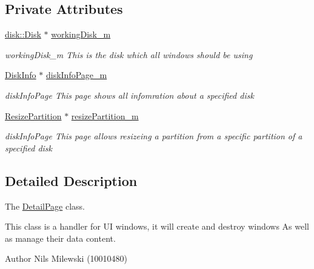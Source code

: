 \subsection*{Private Attributes}
\begin{DoxyCompactItemize}
\item 
\mbox{\label{class_detail_page_a6b523c0c4ee893b693a4e80e37d963c2}} 
\mbox{\hyperlink{classdisk_1_1_disk}{disk\+::\+Disk}} $\ast$ \mbox{\hyperlink{class_detail_page_a6b523c0c4ee893b693a4e80e37d963c2}{working\+Disk\+\_\+m}}
\begin{DoxyCompactList}\small\item\em working\+Disk\+\_\+m This is the disk which all windows should be using \end{DoxyCompactList}\item 
\mbox{\label{class_detail_page_ab455ab95d1ee1cf8009007f4f255f635}} 
\mbox{\hyperlink{class_disk_info}{Disk\+Info}} $\ast$ \mbox{\hyperlink{class_detail_page_ab455ab95d1ee1cf8009007f4f255f635}{disk\+Info\+Page\+\_\+m}}
\begin{DoxyCompactList}\small\item\em disk\+Info\+Page This page shows all infomration about a specified disk \end{DoxyCompactList}\item 
\mbox{\label{class_detail_page_aa1b177ad847e2fb3298a2fbfd3edef1b}} 
\mbox{\hyperlink{class_resize_partition}{Resize\+Partition}} $\ast$ \mbox{\hyperlink{class_detail_page_aa1b177ad847e2fb3298a2fbfd3edef1b}{resize\+Partition\+\_\+m}}
\begin{DoxyCompactList}\small\item\em disk\+Info\+Page This page allows resizeing a partition from a specific partition of a specified disk \end{DoxyCompactList}\end{DoxyCompactItemize}


\subsection{Detailed Description}
The \mbox{\hyperlink{class_detail_page}{Detail\+Page}} class. 

This class is a handler for UI windows, it will create and destroy windows As well as manage their data content. \begin{DoxyAuthor}{Author}
Nils Milewski (10010480) 
\end{DoxyAuthor}


